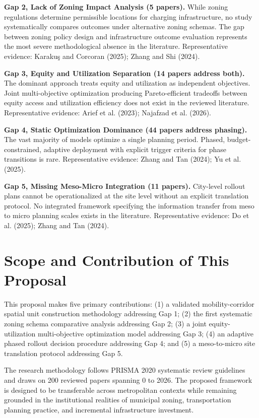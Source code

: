 \documentclass[letterpaper, 12pt, oneside, doublespacing]{Thesis}
\begin{document}
\noindent \textbf{Gap 2, Lack of Zoning Impact Analysis (5 papers).} While zoning regulations determine permissible locations for charging infrastructure, no study systematically compares outcomes under alternative zoning schemas. The gap between zoning policy design and infrastructure outcome evaluation represents the most severe methodological absence in the literature. Representative evidence: Karaku\c{s} and Corcoran (2025); Zhang and Shi (2024).



\noindent \textbf{Gap 3, Equity and Utilization Separation (14 papers address both).} The dominant approach treats equity and utilization as independent objectives. Joint multi-objective optimization producing Pareto-efficient tradeoffs between equity access and utilization efficiency does not exist in the reviewed literature. Representative evidence: Arief et al. (2023); Najafzad et al. (2026).



\noindent \textbf{Gap 4, Static Optimization Dominance (44 papers address phasing).} The vast majority of models optimize a single planning period. Phased, budget-constrained, adaptive deployment with explicit trigger criteria for phase transitions is rare. Representative evidence: Zhang and Tan (2024); Yu et al. (2025).



\noindent \textbf{Gap 5, Missing Meso-Micro Integration (11 papers).} City-level rollout plans cannot be operationalized at the site level without an explicit translation protocol. No integrated framework specifying the information transfer from meso to micro planning scales exists in the literature. Representative evidence: Do et al. (2025); Zhang and Tan (2024).


\section{Scope and Contribution of This Proposal}

This proposal makes five primary contributions: (1) a validated mobility-corridor spatial unit construction methodology addressing Gap 1; (2) the first systematic zoning schema comparative analysis addressing Gap 2; (3) a joint equity-utilization multi-objective optimization model addressing Gap 3; (4) an adaptive phased rollout decision procedure addressing Gap 4; and (5) a meso-to-micro site translation protocol addressing Gap 5.

The research methodology follows PRISMA 2020 systematic review guidelines and draws on 200 reviewed papers spanning 0 to 2026. The proposed framework is designed to be transferable across metropolitan contexts while remaining grounded in the institutional realities of municipal zoning, transportation planning practice, and incremental infrastructure investment.
\end{document}
